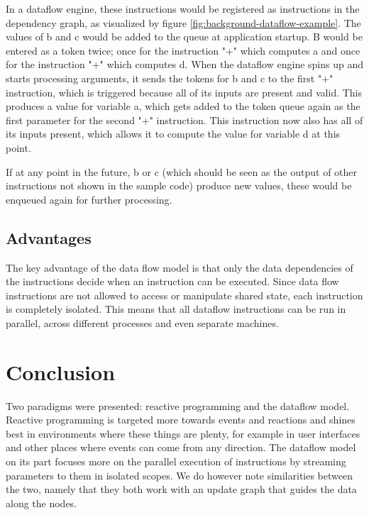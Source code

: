 In a dataflow engine, these instructions would be registered as instructions in the dependency graph, as visualized by figure \ref{fig:background-dataflow-example}. The values of b and c would be added to the queue at application startup. B would be entered as a token twice; once for the instruction "+" which computes a and once for the instruction "+" which computes d. When the dataflow engine spins up and starts processing arguments, it sends the tokens for b and c to the first "+" instruction, which is triggered because all of its inputs are present and valid. This produces a value for variable a, which gets added to the token queue again as the first parameter for the second "+" instruction. This instruction now also has all of its inputs present, which allows it to compute the value for variable d at this point.

If at any point in the future, b or c (which should be seen as the output of other instructions not shown in the sample code) produce new values, these would be enqueued again for further processing.

\subsection{Advantages}

The key advantage of the data flow model is that only the data dependencies of the instructions decide when an instruction can be executed. Since data flow instructions are not allowed to access or manipulate shared state, each instruction is completely isolated. This means that all dataflow instructions can be run in parallel, across different processes and even separate machines.

\section{Conclusion}

Two paradigms were presented: reactive programming and the dataflow model. 
Reactive programming is targeted more towards events and reactions and shines best in environments where these things are plenty, for example in user interfaces and other places where events can come from any direction. The dataflow model on its part focuses more on the parallel execution of instructions by streaming parameters to them in isolated scopes. We do however note similarities between the two, namely that they both work with an update graph that guides the data along the nodes. 



